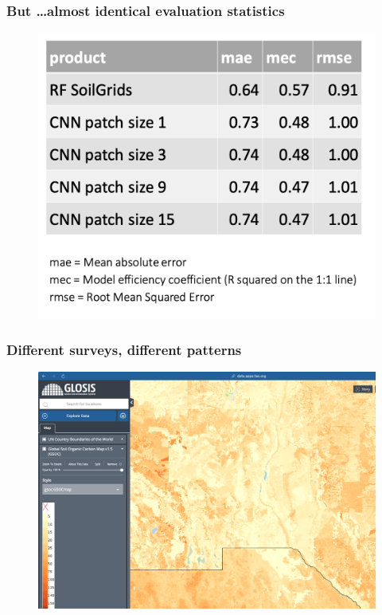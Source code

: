 \documentclass[aspectratio=169]{beamer}
\begin{document}
\begin{frame}
  \frametitle{But \ldots almost identical evaluation statistics}
    \begin{figure}
        \centering
\includegraphics[height=0.7\textheight]{./graphics_david/Genova_poster_stats.png}
     \end{figure}
\end{frame}


\begin{frame}
  \frametitle{Different surveys, different patterns}
    \begin{figure}
        \centering
        \includegraphics[height=0.8\textheight]{./graphics_david/GLOSIS_SOC_LasCrucesRegion.png}
     \end{figure} 
\end{frame}
\end{document}
